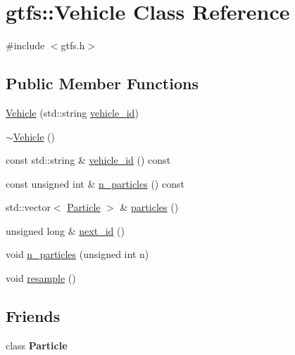\hypertarget{classgtfs_1_1Vehicle}{}\section{gtfs\+:\+:Vehicle Class Reference}
\label{classgtfs_1_1Vehicle}


{\ttfamily \#include $<$gtfs.\+h$>$}

\subsection*{Public Member Functions}
\begin{DoxyCompactItemize}
\item 
\hyperlink{classgtfs_1_1Vehicle_a011c9c3353ce1686ff783a4342f67dfd}{Vehicle} (std\+::string \hyperlink{classgtfs_1_1Vehicle_a8183a0cbc7ab58691b6c056b049ec033}{vehicle\+\_\+id})
\item 
\hyperlink{classgtfs_1_1Vehicle_a08c7450dd0df9406f78b30be044d27d8}{$\sim$\+Vehicle} ()
\item 
const std\+::string \& \hyperlink{classgtfs_1_1Vehicle_a8183a0cbc7ab58691b6c056b049ec033}{vehicle\+\_\+id} () const 
\item 
const unsigned int \& \hyperlink{classgtfs_1_1Vehicle_a53f697645a668f2f04375331fe147dc8}{n\+\_\+particles} () const 
\item 
std\+::vector$<$ \hyperlink{classgtfs_1_1Particle}{Particle} $>$ \& \hyperlink{classgtfs_1_1Vehicle_a83c65fe9c837b76631ed0356a55b674b}{particles} ()
\item 
unsigned long \& \hyperlink{classgtfs_1_1Vehicle_a1d53d3b8a106d0ed967cb63926e79c34}{next\+\_\+id} ()
\item 
void \hyperlink{classgtfs_1_1Vehicle_a2afb781a1158e0e3e2960c1da21a04e8}{n\+\_\+particles} (unsigned int n)
\item 
void \hyperlink{classgtfs_1_1Vehicle_a46ee9775d11595461315be7141359d8a}{resample} ()
\end{DoxyCompactItemize}
\subsection*{Friends}
\begin{DoxyCompactItemize}
\item 
class {\bfseries Particle}\hypertarget{classgtfs_1_1Vehicle_a0f6381b33b90b7e4ab72eeaeec4cc9ff}{}\label{classgtfs_1_1Vehicle_a0f6381b33b90b7e4ab72eeaeec4cc9ff}

\end{DoxyCompactItemize}


